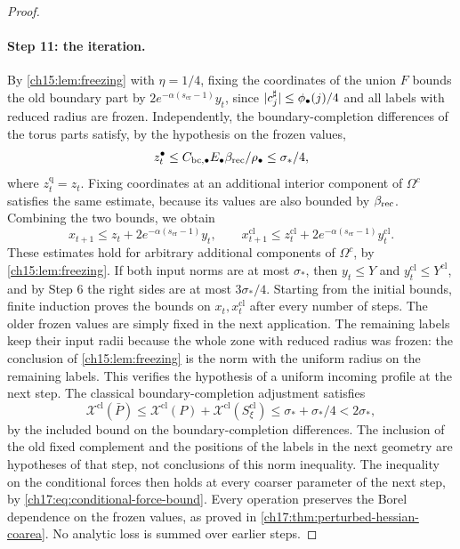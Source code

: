 \begin{proof}
\paragraph{Step 11: the iteration.}
By \cref{ch15:lem:freezing} with $\eta=1/4$, fixing the coordinates of the union $F$ bounds the old boundary part by $2e^{-\alpha(s_{\mathrm{er}}-1)}y_t$, since $\lvert c_j^\sharp\rvert\le\phi_\bullet(j)/4$ and all labels with reduced radius are frozen. Independently, the boundary-completion differences of the torus parts satisfy, by the hypothesis on the frozen values,
\begin{equation}\label{ch17:eq:creation-straddle-bound}
 z_t^\bullet\le C_{\mathrm{bc},\bullet}E_\bullet\beta_{\mathrm{rec}}/\rho_\bullet\le\sigma_*/4,
\end{equation}
where $z_t^{\mathrm q}=z_t$. Fixing coordinates at an additional interior component of $\Omega^c$ satisfies the same estimate, because its values are also bounded by $\beta_{\mathrm{rec}}$. Combining the two bounds, we obtain
\[
 x_{t+1}\le z_t+2e^{-\alpha(s_{\mathrm{er}}-1)}y_t,\qquad x_{t+1}^{\mathrm{cl}}\le z_t^{\mathrm{cl}}+2e^{-\alpha(s_{\mathrm{er}}-1)}y_t^{\mathrm{cl}}.
\]
These estimates hold for arbitrary additional components of $\Omega^c$, by \cref{ch15:lem:freezing}. If both input norms are at most $\sigma_*$, then $y_t\le Y$ and $y_t^{\mathrm{cl}}\le Y^{\mathrm{cl}}$, and by Step 6 the right sides are at most $3\sigma_*/4$. Starting from the initial bounds, finite induction proves the bounds on $x_t,x_t^{\mathrm{cl}}$ after every number of steps. The older frozen values are simply fixed in the next application. The remaining labels keep their input radii because the whole zone with reduced radius was frozen: the conclusion of \cref{ch15:lem:freezing} is the norm with the uniform radius on the remaining labels. This verifies the hypothesis of a uniform incoming profile at the next step. The classical boundary-completion adjustment satisfies
\[
 \mathcal X^{\mathrm{cl}}(\bar P)\le\mathcal X^{\mathrm{cl}}(P)+\mathcal X^{\mathrm{cl}}(S_\xi^{\mathrm{cl}})\le\sigma_*+\sigma_*/4<2\sigma_*,
\]
by the included bound on the boundary-completion differences. The inclusion of the old fixed complement and the positions of the labels in the next geometry are hypotheses of that step, not conclusions of this norm inequality. The inequality on the conditional forces then holds at every coarser parameter of the next step, by \eqref{ch17:eq:conditional-force-bound}. Every operation preserves the Borel dependence on the frozen values, as proved in \cref{ch17:thm:perturbed-hessian-coarea}. No analytic loss is summed over earlier steps.


\end{proof}
